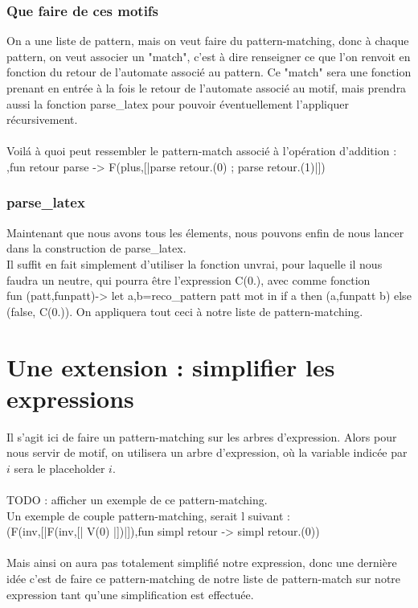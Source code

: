 \documentclass{article}
\theoremstyle{definition}
\newcommand{\chcar}[1]{{\fontfamily{lmtt}\selectfont \color{codepurple}\textit{#1}}}
\newcommand{\codecml}[1]{\colorbox{backcolour}{\fontfamily{phv}\selectfont #1}}
\begin{document}
\subsubsection{Que faire de ces motifs}
On a une liste de pattern, mais on veut faire du pattern-matching, donc \`a chaque pattern, on veut associer un "match", c'est \`a dire renseigner ce que l'on renvoit en fonction du retour de l'automate associ\'e au pattern. Ce "match" sera une fonction prenant en entr\'ee \`a la fois le retour de l'automate associ\'e au motif, mais prendra aussi la fonction \codecml{parse\_latex} pour pouvoir \'eventuellement l'appliquer r\'ecursivement.\\\\
Voil\'a \`a quoi peut ressembler le pattern-match associ\'e \`a l'op\'eration d'addition :\\
\codecml{\chcar{"\%|0;\%+\%|1;\%"},fun retour parse -> F(plus,[|parse retour.(0) ; parse retour.(1)|])}

\subsubsection{\codecml{parse\_latex}}
Maintenant que nous avons tous les \'elements, nous pouvons enfin de nous lancer dans la construction de \codecml{parse\_latex}.\\
Il suffit en fait simplement d'utiliser la fonction \codecml{unvrai}, pour laquelle il nous faudra un neutre, qui pourra \^etre l'expression \codecml{C(0.)}, avec comme fonction \\
\codecml{fun (patt,funpatt)-> let a,b=reco\_pattern patt mot in if a then (a,funpatt b) else (false, C(0.))}.
On appliquera tout ceci \`a notre liste de pattern-matching.
\section{Une extension : simplifier les expressions}
Il s'agit ici de faire un pattern-matching sur les arbres d'expression. Alors pour nous servir de motif, on utilisera un arbre d'expression, o\`u la variable indic\'ee par $i$ sera le placeholder $i$.\\\\
{\Large TODO : afficher un exemple de ce pattern-matching.}\\
Un exemple de couple pattern-matching, serait l suivant : \\
\codecml{(F(inv,[|F(inv,[| V(0) |])|]),fun simpl retour -> simpl retour.(0))}\\\\
Mais ainsi on aura pas totalement simplifi\'e notre expression, donc une derni\`ere id\'ee c'est de faire ce pattern-matching de notre liste de pattern-match sur notre expression tant qu'une simplification est effectu\'ee.
\listoffigures
\end{document}
